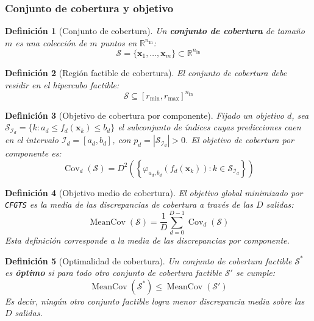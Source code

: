 \documentclass[12pt]{report} %
\newtheorem{definition}{Definición}
\begin{document}
\subsubsection{Conjunto de cobertura y objetivo}

\begin{definition}[Conjunto de cobertura]
    Un \textbf{conjunto de cobertura} de tamaño $m$ es una colección de $m$ puntos en $\mathbb{R}^{n_{\text{In}}}$:
    $$\mathcal{S} = \{\mathbf{x}_1, \ldots, \mathbf{x}_m\} \subset \mathbb{R}^{n_{\text{In}}}$$
\end{definition}

\begin{definition}[Región factible de cobertura]
    El conjunto de cobertura debe residir en el hipercubo factible:
    $$\mathcal{S} \subseteq [r_{\min}, r_{\max}]^{n_{\text{In}}}$$
\end{definition}

\begin{definition}[Objetivo de cobertura por componente]
    Fijado un objetivo $d$, sea $\mathcal{S}_{\mathcal{I}_d} = \{k : a_d \leq f_d(\mathbf{x}_k) \leq b_d\}$ el subconjunto de índices cuyas predicciones caen en el intervalo $\mathcal{I}_d = [a_d, b_d]$, con $p_d = |\mathcal{S}_{\mathcal{I}_d}| > 0$. El objetivo de cobertura por componente es:
    $$\operatorname{Cov}_d(\mathcal{S}) = D^2\!\left(\left\{\varphi_{a_d,b_d}(f_d(\mathbf{x}_k)) : k \in \mathcal{S}_{\mathcal{I}_d}\right\}\right)$$
\end{definition}

\begin{definition}[Objetivo medio de cobertura]
    El objetivo global minimizado por \texttt{CFGTS} es la media de las discrepancias de cobertura a través de las $D$ salidas:
    $$\operatorname{MeanCov}(\mathcal{S}) = \frac{1}{D}\sum_{d=0}^{D-1} \operatorname{Cov}_d(\mathcal{S})$$
    Esta definición corresponde a la media de las discrepancias por componente.
\end{definition}

\begin{definition}[Optimalidad de cobertura]
    Un conjunto de cobertura factible $\mathcal{S}^*$ es \textbf{óptimo} si para todo otro conjunto de cobertura factible $\mathcal{S}'$ se cumple:
    $$\operatorname{MeanCov}(\mathcal{S}^*) \leq \operatorname{MeanCov}(\mathcal{S}')$$
    Es decir, ningún otro conjunto factible logra menor discrepancia media sobre las $D$ salidas.
\end{definition}
\end{document}
